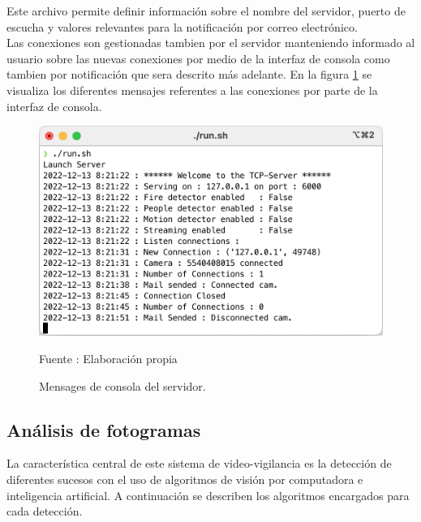 Este archivo permite definir información sobre el nombre del servidor, puerto de escucha y valores relevantes para la notificación por correo electrónico.\\

Las conexiones son gestionadas tambien por el servidor manteniendo informado al usuario sobre las nuevas conexiones por medio de la interfaz de consola como tambien por notificación que sera descrito más adelante. En la figura \ref{fig:server_messages} se visualiza los diferentes mensajes referentes a las conexiones por parte de la interfaz de consola.\\

\begin{figure}[H]
    \begin{center}
        \includegraphics[width=12cm]{img/capitulo_5/server_messages.png}
    \end{center}
    \begin{center}
        \caption{Mensages de consola del servidor.}
        Fuente : Elaboración propia
        \label{fig:server_messages}
    \end{center}
\end{figure}

\subsection{Análisis de fotogramas}
La característica central de este sistema de video-vigilancia es la detección de diferentes sucesos con el uso de algoritmos de visión por computadora e inteligencia artificial. A continuación se describen los algoritmos encargados para cada detección.\\


